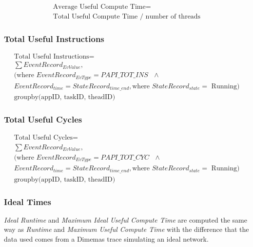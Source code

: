 \documentclass[article,12pt]{memoir}
\begin{document}
	\begin{equation}\label{avustime}
		\begin{gathered}
			\text{Average Useful Compute Time} =\\
			\text{Total Useful Compute Time } / \text{ number of threads}
		\end{gathered}
	\end{equation}
	
	\subsubsection{Total Useful Instructions}
	\begin{equation}\label{totusins}
		\begin{gathered}
			\text{Total Useful Instructions} =\\
			\sum EventRecord_{EvValue},\\
			\big(\text{where~$EventRecord_{EvType} = PAPI\_TOT\_INS$ }\wedge\\
			EventRecord_{time} = StateRecord_{time\_end}, \text{where~$StateRecord_{state} =$ Running}\big)\\
			\text{groupby(appID, taskID, theadID)}
		\end{gathered}
	\end{equation}
	
	\subsubsection{Total Useful Cycles}
	\begin{equation}\label{totuscyc}
	\begin{gathered}
	\text{Total Useful Cycles} =\\
		\sum EventRecord_{EvValue},\\
		\big(\text{where~$EventRecord_{EvType} = PAPI\_TOT\_CYC$ }\wedge\\
		EventRecord_{time} = StateRecord_{time\_end}, \text{where~$StateRecord_{state} =$ Running}\big)\\
		\text{groupby(appID, taskID, theadID)}
	\end{gathered}
	\end{equation}
	
	\subsubsection{Ideal Times}
	\textit{Ideal Runtime} and \textit{Maximum Ideal Useful Compute Time} are computed the same way as \textit{Runtime} and \textit{Maximum Useful Compute Time} with the difference that the data used comes from a Dimemas trace simulating an ideal network.
	
\end{document}

